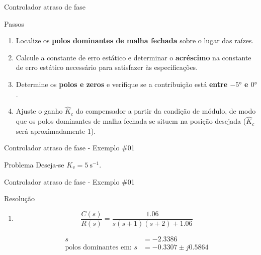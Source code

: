 \begin{frame}{Controlador atraso de fase}
	\begin{block}{Passos}
		\begin{enumerate}
			\item Localize os \textbf{polos dominantes de malha fechada} sobre o lugar das raízes.
			\item Calcule a constante de erro estático e determinar o \textbf{acréscimo} na constante de erro estático necessário para satisfazer às especificações.
			\item Determine os \textbf{polos e zeros} e verifique se a contribuição está \textbf{entre $ \ang{-5} $ e $ \ang{0} $}.
			\item Ajuste o ganho $\hat{K}_c$ do compensador a partir da condição de módulo, de modo que os polos dominantes de malha fechada se situem na posição desejada ($\hat{K}_c$ será aproximadamente 1).
		\end{enumerate}
	\end{block}
\end{frame}


\begin{frame}{Controlador atraso de fase - Exemplo \#01}
\begin{block}{Problema}
Deseja-se $K_v=\SI{5}{\second^{-1}} $.
\end{block}

\vspace{1cm}

\centering

\scalebox{0.9}{}
\end{frame}


\begin{frame}{Controlador atraso de fase - Exemplo \#01}
\begin{block}{Resolução}
\begin{enumerate}
	\item \[ \dfrac{C(s)}{R(s)}=\dfrac{\num{1,06}}{s(s+1)(s+2)+\num{1,06}} \]
	
	\begin{align*}
		s&=\num{-2,3386}\\
		\text{polos dominantes em: }s&=\num{-0,3307}\pm j\num{0,5864}
	\end{align*}
\end{enumerate}
\end{block}
\end{frame}


